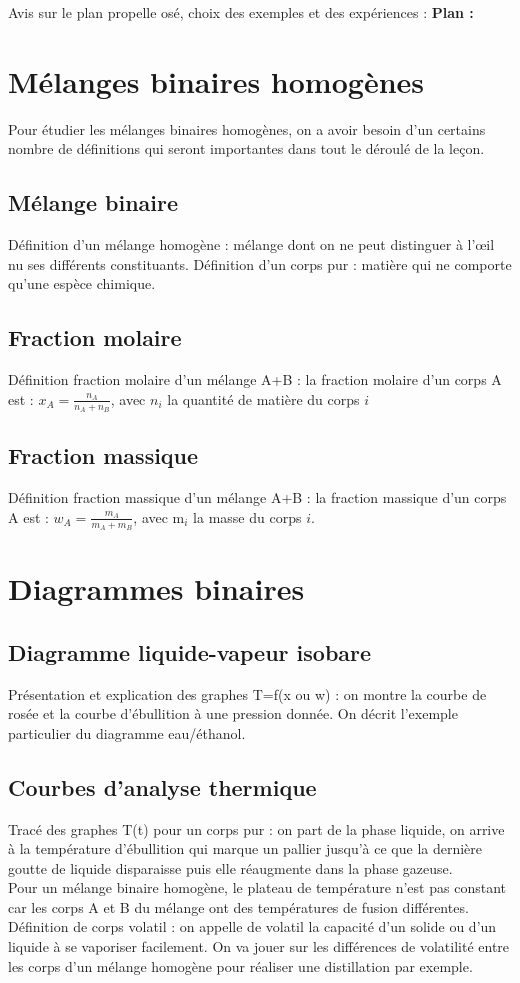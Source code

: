 \begin{reportBlock}{Avis sur le plan propelle osé, choix des exemples et des expériences : }
\textbf{Plan :}\\
\section{Mélanges binaires homogènes}
Pour étudier les mélanges binaires homogènes, on a avoir besoin d'un certains nombre de définitions qui seront importantes dans tout le déroulé de la leçon.
\subsection{Mélange binaire}
Définition d'un mélange homogène : mélange dont on ne peut distinguer à l'\oe il nu ses différents constituants.
Définition d'un corps pur : matière qui ne comporte qu'une espèce chimique.
\subsection{Fraction molaire}
Définition fraction molaire d'un mélange A+B : la fraction molaire d'un corps A est : $x_{A}=\frac{n_A}{n_A+n_B}$, avec $n_i$ la quantité de matière du corps $i$
\subsection{Fraction massique}
Définition fraction massique d'un mélange A+B : la fraction massique d'un corps A est : $w_{A}=\frac{m_A}{m_A+m_B}$, avec m$_i$ la masse du corps $i$.
\section{Diagrammes binaires}
\subsection{Diagramme liquide-vapeur isobare}
Présentation et explication des graphes T=f(x ou w) : on montre la courbe de rosée et la courbe d'ébullition à une pression donnée. On décrit l'exemple particulier du diagramme eau/éthanol.
\subsection{Courbes d'analyse thermique}
Tracé des graphes T(t) pour un corps pur : on part de la phase liquide, on arrive à la température d'ébullition qui marque un pallier jusqu'à ce que la dernière goutte de liquide disparaisse puis elle réaugmente dans la phase gazeuse.\\
Pour un mélange binaire homogène, le plateau de température n'est pas constant car les corps A et B du mélange ont des températures de fusion différentes.\\ 
Définition de corps volatil : on appelle de volatil la capacité d'un solide ou d'un liquide à se vaporiser facilement. On va jouer sur les différences de volatilité entre les corps d'un mélange homogène pour réaliser une distillation par exemple.

\end{reportBlock}
